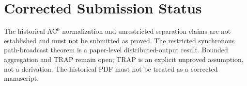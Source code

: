 \section*{Corrected Submission Status}
The historical AC$^0$ normalization and unrestricted separation
claims are not established and must not be submitted as proved.
The restricted synchronous path-broadcast theorem is a paper-level
distributed-output result. Bounded aggregation and TRAP remain open;
TRAP is an explicit unproved assumption, not a derivation.
The historical PDF must not be treated as a corrected manuscript.
